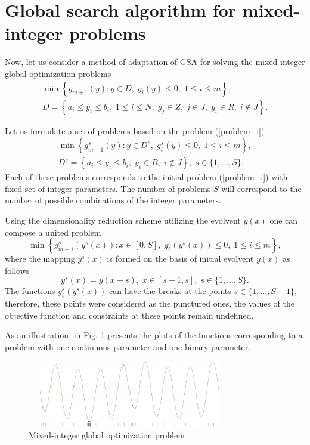 \documentclass{llncs}
\begin{document}
\section{Global search algorithm for mixed-integer problems}

Now, let us consider a method of adaptation of GSA for solving the mixed-integer global 
optimization problems 
\begin{gather}\label{problem_i}
\min{\left\{ g_{m+1}(y):y\in D, \; g_i(y)\leq 0, \; 1 \leq i \leq m\right\}},\\
D=\left\{a_i\leq y_i \leq b_i, \; 1\leq i \leq N, \; y_j \in Z, \; j \in J, \; y_i \in R, \; i \notin J \right\}.\nonumber
\end{gather}

Let us formulate a set of problems based on the problem (\ref{problem_i})
\begin{gather}\label{problem_is}
\min{\left\{ g_{m+1}^s(y):y\in D^s, \; g_i^s(y)\leq 0, \; 1 \leq i \leq m\right\}},\\
D^s=\left\{ a_i\leq y_i \leq b_i, \;  y_i \in R, \; i \notin J \right\}, \; s\in\{1,...,S\}.\nonumber 
\end{gather}
Each of these problems corresponds to the initial problem (\ref{problem_i}) with fixed set of 
integer parameters. The number of problems $S$ will correspond to the number of possible 
combinations of the integer parameters.

Using the dimensionality reduction scheme utilizing the evolvent $y(x)$ 
one can compose a united problem 
\begin{equation}\label{problem_is1}
\min \left\{g_{m+1}^s(y^s(x)): x \in [0,S], \; g_i^s(y^s(x)) \leq 0, \; 1 \leq i \leq m\right\},
\end{equation}
where the mapping $y^s(x)$ is formed on the basis of initial evolvent $y(x)$ as follows
\[
y^s(x)=y(x-s), \; x\in[s-1,s],\; s\in\{1,...,S\}.
\]
The functions $g_i^s(y^s(x))$ can have the breaks at the points $s\in \{1,...,S-1\}$, therefore, 
these points were considered as the punctured ones, the values of the objective function and 
constraints at these points remain undefined.

As an illustration, in Fig. \ref{fig:1} presents the plots of the functions corresponding to a 
problem with one continuous parameter and one binary parameter.

\begin{figure}[ht]
    \centering
    \includegraphics[height=2.9cm,width=0.8\textwidth]{fig1.jpg}
    \caption{Mixed-integer global optimization problem}
    \label{fig:1}
\end{figure}
\end{document}
